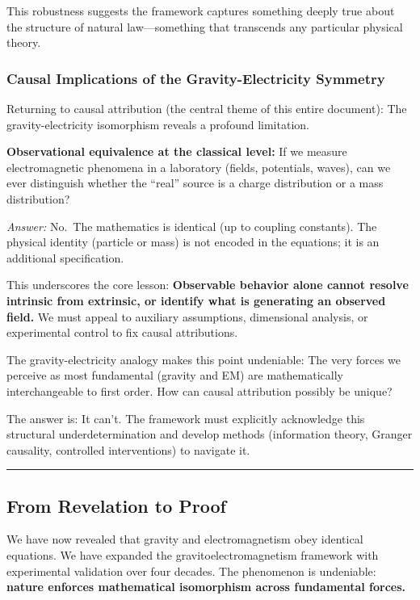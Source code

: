 \documentclass[
]{article}
\begin{document}
This robustness suggests the framework captures something deeply true
about the structure of natural law---something that transcends any
particular physical theory.

\subsubsection{Causal Implications of the Gravity-Electricity
Symmetry}\label{causal-implications-of-the-gravity-electricity-symmetry}

Returning to causal attribution (the central theme of this entire
document): The gravity-electricity isomorphism reveals a profound
limitation.

\textbf{Observational equivalence at the classical level:} If we measure
electromagnetic phenomena in a laboratory (fields, potentials, waves),
can we ever distinguish whether the ``real'' source is a charge
distribution or a mass distribution?

\emph{Answer:} No.~The mathematics is identical (up to coupling
constants). The physical identity (particle or mass) is not encoded in
the equations; it is an additional specification.

This underscores the core lesson: \textbf{Observable behavior alone
cannot resolve intrinsic from extrinsic, or identify what is generating
an observed field.} We must appeal to auxiliary assumptions, dimensional
analysis, or experimental control to fix causal attributions.

The gravity-electricity analogy makes this point undeniable: The very
forces we perceive as most fundamental (gravity and EM) are
mathematically interchangeable to first order. How can causal
attribution possibly be unique?

The answer is: It can't. The framework must explicitly acknowledge this
structural underdetermination and develop methods (information theory,
Granger causality, controlled interventions) to navigate it.

\begin{center}\rule{0.5\linewidth}{0.5pt}\end{center}

\subsection{From Revelation to Proof}\label{from-revelation-to-proof}

We have now revealed that gravity and electromagnetism obey identical
equations. We have expanded the gravitoelectromagnetism framework with
experimental validation over four decades. The phenomenon is undeniable:
\textbf{nature enforces mathematical isomorphism across fundamental
forces.}
\end{document}
